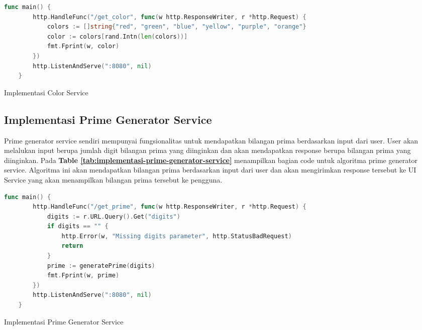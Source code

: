 \begin{table}[H]
  \centering
  \begin{minipage}{0.95\linewidth}
    \begin{lstlisting}[language=go, basicstyle=\footnotesize\ttfamily]
    func main() {
        http.HandleFunc("/get_color", func(w http.ResponseWriter, r *http.Request) {
            colors := []string{"red", "green", "blue", "yellow", "purple", "orange"}
            color := colors[rand.Intn(len(colors))]
            fmt.Fprint(w, color)
        })
        http.ListenAndServe(":8080", nil)
    }
    \end{lstlisting}
  \end{minipage}
  \caption{Implementasi Color Service}
  \label{tab:implementasi-color-service}
\end{table}

\subsection{Implementasi Prime Generator Service}
Prime generator service sendiri mempunyai fungsionalitas untuk mendapatkan
bilangan prima berdasarkan input dari user. User akan melalukan input berupa
jumlah digit bilangan prima yang diinginkan dan akan mendapatkan response
berupa bilangan prima yang diinginkan. Pada \textbf{Table
  \ref{tab:implementasi-prime-generator-service}} menampilkan bagian code untuk
algoritma prime generator service. Algoritma ini akan mendapatkan bilangan
prima berdasarkan input dari user dan akan mengirimkan response tersebut ke UI
Service yang akan menampilkan bilangan prima tersebut ke pengguna.

\begin{table}[H]
  \centering
  \begin{minipage}{0.95\linewidth}
    \begin{lstlisting}[language=go, basicstyle=\footnotesize\ttfamily]
    func main() {
        http.HandleFunc("/get_prime", func(w http.ResponseWriter, r *http.Request) {
            digits := r.URL.Query().Get("digits")
            if digits == "" {
                http.Error(w, "Missing digits parameter", http.StatusBadRequest)
                return
            }
            prime := generatePrime(digits)
            fmt.Fprint(w, prime)
        })
        http.ListenAndServe(":8080", nil)
    }
    \end{lstlisting}
  \end{minipage}
  \caption{Implementasi Prime Generator Service}
  \label{tab:implementasi-prime-generator-service}
\end{table}

